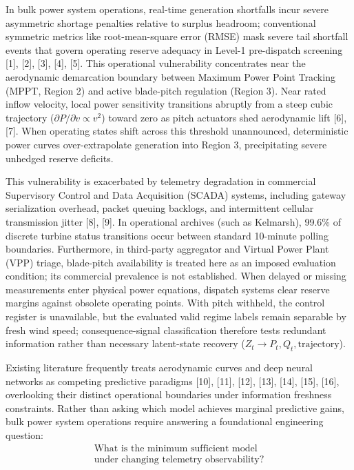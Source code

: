 \documentclass[
  journal]{IEEEtran}
\makeatletter
\def\section{\@startsection{section}{1}{\z@}{0.75ex plus 0.15ex minus 0.1ex}{0.25ex plus 0.08ex}{\normalfont\footnotesize\bfseries\centering\scshape}}
\makeatother
\begin{document}
\section{Introduction}\label{introduction}

In bulk power system operations, real-time generation shortfalls incur
severe asymmetric shortage penalties relative to surplus headroom;
conventional symmetric metrics like root-mean-square error (RMSE) mask
severe tail shortfall events that govern operating reserve adequacy in
Level-1 pre-dispatch screening {[}1{]}, {[}2{]}, {[}3{]}, {[}4{]},
{[}5{]}. This operational vulnerability concentrates near the
aerodynamic demarcation boundary between Maximum Power Point Tracking
(MPPT, Region 2) and active blade-pitch regulation (Region 3). Near
rated inflow velocity, local power sensitivity transitions abruptly from
a steep cubic trajectory (\(\partial P / \partial v \propto v^2\))
toward zero as pitch actuators shed aerodynamic lift {[}6{]}, {[}7{]}.
When operating states shift across this threshold unannounced,
deterministic power curves over-extrapolate generation into Region 3,
precipitating severe unhedged reserve deficits.

This vulnerability is exacerbated by telemetry degradation in commercial
Supervisory Control and Data Acquisition (SCADA) systems, including
gateway serialization overhead, packet queuing backlogs, and
intermittent cellular transmission jitter {[}8{]}, {[}9{]}. In
operational archives (such as Kelmarsh), 99.6\% of discrete turbine
status transitions occur between standard 10-minute polling boundaries.
Furthermore, in third-party aggregator and Virtual Power Plant (VPP)
triage, blade-pitch availability is treated here as an imposed
evaluation condition; its commercial prevalence is not established. When
delayed or missing measurements enter physical power equations, dispatch
systems clear reserve margins against obsolete operating points. With
pitch withheld, the control register is unavailable, but the evaluated
valid regime labels remain separable by fresh wind speed;
consequence-signal classification therefore tests redundant information
rather than necessary latent-state recovery
(\(Z_t \to P_t, Q_t, \text{trajectory}\)).

Existing literature frequently treats aerodynamic curves and deep neural
networks as competing predictive paradigms {[}10{]}, {[}11{]}, {[}12{]},
{[}13{]}, {[}14{]}, {[}15{]}, {[}16{]}, overlooking their distinct
operational boundaries under information freshness constraints. Rather
than asking which model achieves marginal predictive gains, bulk power
system operations require answering a foundational engineering question:
\begin{equation}
\boxed{
\begin{gathered}
\text{What is the minimum sufficient model} \\
\text{under changing telemetry observability?}
\end{gathered}
}
\label{eq:core-question}
\end{equation}
\end{document}
